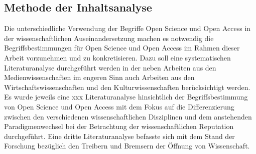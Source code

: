 \subsection{Methode der Inhaltsanalyse}
Die unterschiedliche Verwendung der Begriffe Open Science und Open Access in der wissenschaftlichen Auseinandersetzung machen es notwendig die Begriffsbestimmungen für Open Science und Open Access im Rahmen dieser Arbeit vorzunehmen und zu konkretisieren. Dazu soll eine systematischen Literaturanalyse durchgeführt werden in der neben Arbeiten aus den Medienwissenschaften im engeren Sinn auch Arbeiten aus den Wirtschaftswissenschaften und den Kulturwissenschaften  berücksichtigt werden.
Es wurde jeweils eine xxx Literaturanalyse hinsichtlich der Begriffsbestimmung von Open Science und Open Access mit dem Fokus auf die Differenzierung zwischen den verschiedenen wissenschaftlichen Disziplinen und dem anstehenden Paradigmenwechsel bei der Betrachtung der wissenschaftlichen Reputation durchgeführt. Eine dritte Literaturanalyse befasste sich mit dem Stand der Forschung bezüglich den Treibern und Bremsern der Öffnung von Wissenschaft.

